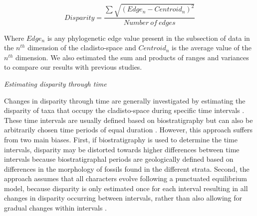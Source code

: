 \documentclass[12pt,letterpaper]{article}
\renewcommand{\subsection}[1]{%
\bigskip
\begin{center}
\begin{large}
\normalfont\itshape #1
\end{large}
\end{center}}
\begin{document}
  \begin{equation}
    Disparity=\frac{\sum{\sqrt{(Edge_{n}-Centroid_{n})^2}}}{Number\ of\ edges}
  \end{equation}

Where $Edge_{n}$ is any phylogenetic edge value %
present in the subsection of data in the $n^{th}$ dimension of the cladisto-space %
and $Centroid_{n}$ is the average value of the $n^{th}$ dimension. %
We also estimated the sum and products of ranges and variances to compare our results with previous studies. %

\subsection{Estimating disparity through time} %
Changes in disparity through time are generally investigated by estimating the disparity of taxa that occupy the cladisto-space during specific time intervals \citep[e.g][]{cisneros2010,prentice2011,Hughes20082013,hopkinsdecoupling2013,bentonmodels2014,bensonfaunal2014}.
These time intervals are usually defined based on biostratigraphy \citep[e.g.][]{cisneros2010,prentice2011,Hughes20082013,bentonmodels2014} but can also be arbitrarily chosen time periods of equal duration \citep{hopkinsdecoupling2013,bensonfaunal2014}.
However, this approach suffers from two main biases. 
First, if biostratigraphy is used to determine the time intervals, disparity may be distorted towards higher differences between time intervals because biostratigraphal periods are geologically defined based on differences in the morphology of fossils found in the different strata.
Second, the approach assumes that all characters evolve following a punctuated equilibrium model, because disparity is only estimated once for each interval resulting in all changes in disparity occurring between intervals, rather than also allowing for gradual changes within intervals \citep{Hunt21042015}.
\end{document}
